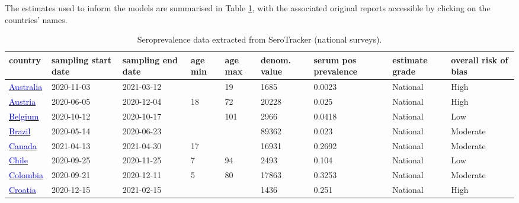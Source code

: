 The estimates used to inform the models are summarised in Table \ref{tab:sero_national}, with the associated original reports accessible by clicking on the countries' names.

\begin{table}[!ht]  
    \footnotesize
    \begin{center}
        \caption{Seroprevalence data extracted from SeroTracker (national surveys).}
        \label{tab:sero_national}
        \begin{tabular}{p{2cm} | p{1.6cm} | p{1.6cm} | p{0.8cm} | p{0.8cm} | p{1cm} | p{1.3cm} | p{1.2cm} | p{1.2cm}}
           \hline            
           
           \textbf{country} & \textbf{sampling start date} & \textbf{sampling end date} & \textbf{age min} & \textbf{age max} & \textbf{denom. value} & \textbf{serum pos prevalence} & \textbf{estimate grade} & \textbf{overall risk of bias} \\ 
\hline 
\href{https://dx.doi.org/10.5694/mja2.51542}{\textcolor{blue}{Australia}} & 2020-11-03 & 2021-03-12 &  & 19 & 1685 & 0.0023 & National & High \\ 
\hline 
\href{https://dx.doi.org/10.1007/s15010-021-01639-0}{\textcolor{blue}{Austria}} & 2020-06-05 & 2020-12-04 & 18 & 72 & 20228 & 0.025 & National & High \\ 
\hline 
\href{https://dx.doi.org/10.2807/1560-7917.ES.2022.27.9.2100419}{\textcolor{blue}{Belgium}} & 2020-10-12 & 2020-10-17 &  & 101 & 2966 & 0.0418 & National & Low \\ 
\hline 
\href{https://www.ncbi.nlm.nih.gov/pmc/articles/PMC8225319/}{\textcolor{blue}{Brazil}} & 2020-05-14 & 2020-06-23 &  &  & 89362 & 0.023 & National & Moderate \\ 
\hline 
\href{https://serotracker.com/en/Explore}{\textcolor{blue}{Canada}} & 2021-04-13 & 2021-04-30 & 17 &  & 16931 & 0.2692 & National & Moderate \\ 
\hline 
\href{https://dx.doi.org/10.1186/s12879-022-07045-7}{\textcolor{blue}{Chile}} & 2020-09-25 & 2020-11-25 & 7 & 94 & 2493 & 0.104 & National & Low \\ 
\hline 
\href{https://dx.doi.org/10.1016/j.lana.2022.100195}{\textcolor{blue}{Colombia}} & 2020-09-21 & 2020-12-11 & 5 & 80 & 17863 & 0.3253 & National & Moderate \\ 
\hline 
\href{https://dx.doi.org/10.3390/pathogens10060774}{\textcolor{blue}{Croatia}} & 2020-12-15 & 2021-02-15 &  &  & 1436 & 0.251 & National & High \\ 

\end{tabular}
\end{center}
\end{table}
